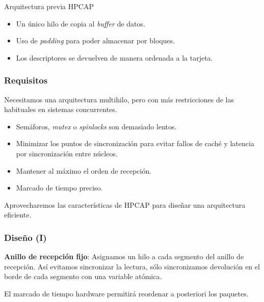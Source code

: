 \documentclass[10pt,notes,compress,usetitleprogressbar,aspectratio=1610]{beamer}
\begin{document}
\begin{frame}{Arquitectura previa HPCAP}

\begin{figure}[hbtp]
\centering

\end{figure}

\begin{itemize}
\item Un único hilo de copia al \textit{buffer} de datos.
\item Uso de \textit{padding} para poder almacenar por bloques. 
\item Los descriptores se devuelven de manera ordenada a la tarjeta.
\end{itemize}

\end{frame}

\begin{frame}
\frametitle{Requisitos}


Necesitamos una arquitectura multihilo, pero con más restricciones de las habituales en sistemas concurrentes.

\begin{itemize}
\item Semáforos, \textit{mutex} o \textit{spinlocks} son demasiado lentos.
\item Minimizar los puntos de sincronización para evitar fallos de caché y latencia por sincronización entre núcleos.
\item Mantener al máximo el orden de recepción.
\item Marcado de tiempo preciso.
\end{itemize}

Aprovecharemos las características de HPCAP para diseñar una arquitectura eficiente.
\end{frame}

\begin{frame}
\frametitle{Diseño (I)}

\begin{figure}
\centering

\end{figure}

\textbf{Anillo de recepción fijo}: Asignamos un hilo a cada segmento del anillo de recepción. Así evitamos sincronizar la lectura, sólo sincronizamos devolución en el borde de cada segmento con una variable atómica. 

El marcado de tiempo hardware permitirá reordenar a posteriori los paquetes. 

\end{frame}
\end{document}
